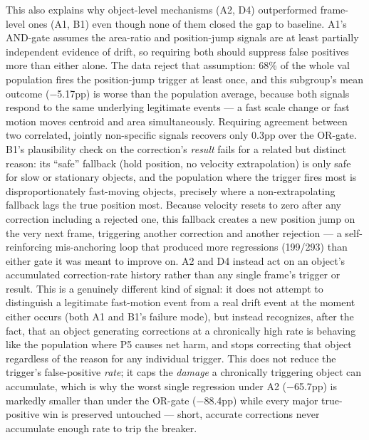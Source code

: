 \documentclass[11pt]{article}
\begin{document}
This also explains why object-level mechanisms (A2, D4) outperformed frame-level ones (A1, B1) even though none of them closed the gap to baseline. A1's AND-gate assumes the area-ratio and position-jump signals are at least partially independent evidence of drift, so requiring both should suppress false positives more than either alone. The data reject that assumption: 68\% of the whole val population fires the position-jump trigger at least once, and this subgroup's mean outcome ($-$5.17pp) is worse than the population average, because both signals respond to the same underlying legitimate events — a fast scale change or fast motion moves centroid and area simultaneously. Requiring agreement between two correlated, jointly non-specific signals recovers only 0.3pp over the OR-gate. B1's plausibility check on the correction's \emph{result} fails for a related but distinct reason: its ``safe'' fallback (hold position, no velocity extrapolation) is only safe for slow or stationary objects, and the population where the trigger fires most is disproportionately fast-moving objects, precisely where a non-extrapolating fallback lags the true position most. Because velocity resets to zero after any correction including a rejected one, this fallback creates a new position jump on the very next frame, triggering another correction and another rejection — a self-reinforcing mis-anchoring loop that produced more regressions (199/293) than either gate it was meant to improve on. A2 and D4 instead act on an object's accumulated correction-rate history rather than any single frame's trigger or result. This is a genuinely different kind of signal: it does not attempt to distinguish a legitimate fast-motion event from a real drift event at the moment either occurs (both A1 and B1's failure mode), but instead recognizes, after the fact, that an object generating corrections at a chronically high rate is behaving like the population where P5 causes net harm, and stops correcting that object regardless of the reason for any individual trigger. This does not reduce the trigger's false-positive \emph{rate}; it caps the \emph{damage} a chronically triggering object can accumulate, which is why the worst single regression under A2 ($-$65.7pp) is markedly smaller than under the OR-gate ($-$88.4pp) while every major true-positive win is preserved untouched — short, accurate corrections never accumulate enough rate to trip the breaker.
\end{document}
